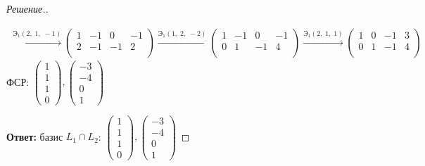 \documentclass[a4paper]{article}
\theoremstyle{remark}
\newcommand{\arron}[3]{%
  \ensuremath{\xrightarrow{\text{Э}_1(#1,\; #2,\; #3)}}%
}
\begin{document}
\begin{proof}[Решение.]
\begin{enumerate}
\begin{multline*}
                    \arron{2}{1}{-1}
                    \begin{pmatrix}
                        1 & -1 & 0 & -1 \\
                        2 & -1 & -1 & 2 \\
                    \end{pmatrix} 
                    \arron{1}{2}{-2}
                    \begin{pmatrix}
                        1 & -1 & 0 & -1 \\
                        0 & 1 & -1 & 4 \\
                    \end{pmatrix} 
                    \arron{2}{1}{1}
                    \begin{pmatrix}
                        1 & 0 & -1 & 3 \\
                        0 & 1 & -1 & 4 \\
                    \end{pmatrix} 
                \end{multline*}
                ФСР: $
                \begin{pmatrix}
                    1\\
                    1\\
                    1\\
                    0
                \end{pmatrix}, 
                \begin{pmatrix}
                    -3\\
                    -4\\
                    0\\
                    1
                \end{pmatrix}
                $
            \end{enumerate}
            \textbf{Ответ:} базис $L_1 \cap L_2$: $
            \begin{pmatrix}
                1\\
                1\\
                1\\
                0
            \end{pmatrix}, 
            \begin{pmatrix}
                -3\\
                -4\\
                0\\
                1
            \end{pmatrix}
            $

        \end{proof}
\end{document}

